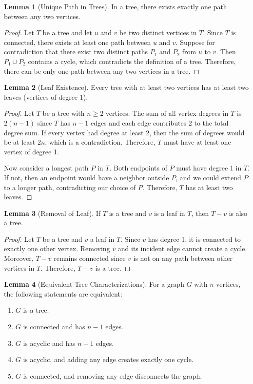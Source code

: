 \documentclass{article}
\theoremstyle{definition}
\newtheorem{lemma}{Lemma}
\begin{document}
\begin{lemma}[Unique Path in Trees]
In a tree, there exists exactly one path between any two vertices.
\end{lemma}

\begin{proof}
Let $T$ be a tree and let $u$ and $v$ be two distinct vertices in $T$. Since $T$ is connected, there exists at least one path between $u$ and $v$. Suppose for contradiction that there exist two distinct paths $P_1$ and $P_2$ from $u$ to $v$. Then $P_1 \cup P_2$ contains a cycle, which contradicts the definition of a tree. Therefore, there can be only one path between any two vertices in a tree.
\end{proof}

\begin{lemma}[Leaf Existence]
Every tree with at least two vertices has at least two leaves (vertices of degree 1).
\end{lemma}

\begin{proof}
Let $T$ be a tree with $n \geq 2$ vertices. The sum of all vertex degrees in $T$ is $2(n-1)$ since $T$ has $n-1$ edges and each edge contributes 2 to the total degree sum. If every vertex had degree at least 2, then the sum of degrees would be at least $2n$, which is a contradiction. Therefore, $T$ must have at least one vertex of degree 1.

Now consider a longest path $P$ in $T$. Both endpoints of $P$ must have degree 1 in $T$. If not, then an endpoint would have a neighbor outside $P$, and we could extend $P$ to a longer path, contradicting our choice of $P$. Therefore, $T$ has at least two leaves.
\end{proof}

\begin{lemma}[Removal of Leaf]
If $T$ is a tree and $v$ is a leaf in $T$, then $T - v$ is also a tree.
\end{lemma}

\begin{proof}
Let $T$ be a tree and $v$ a leaf in $T$. Since $v$ has degree 1, it is connected to exactly one other vertex. Removing $v$ and its incident edge cannot create a cycle. Moreover, $T - v$ remains connected since $v$ is not on any path between other vertices in $T$. Therefore, $T - v$ is a tree.
\end{proof}

\begin{lemma}[Equivalent Tree Characterizations]
For a graph $G$ with $n$ vertices, the following statements are equivalent:
\begin{enumerate}
    \item $G$ is a tree.
    \item $G$ is connected and has $n-1$ edges.
    \item $G$ is acyclic and has $n-1$ edges.
    \item $G$ is acyclic, and adding any edge creates exactly one cycle.
    \item $G$ is connected, and removing any edge disconnects the graph.
\end{enumerate}
\end{lemma}
\pagebreak
\end{document}
